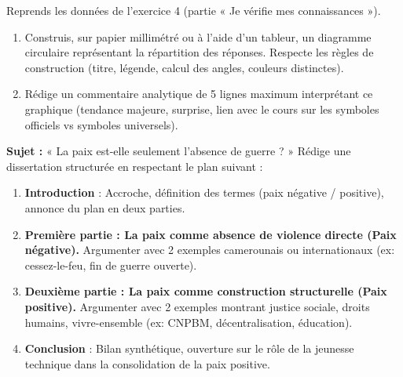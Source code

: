 \documentclass[11pt]{article}
\newcounter{popsec}
\newcounter{popsub}
\newcommand{\courssub}[1]{%
  \stepcounter{popsub}%
  \par\vspace{9pt}\noindent{\popxbold\fontsize{11.5}{13}\selectfont\color{popink}{\color{poporange}\thepopsec.\thepopsub}\hspace{6pt}#1}\par\nopagebreak\vspace{4pt}
}
\begin{document}
\begin{exercice}
Reprends les données de l'exercice 4 (partie « Je vérifie mes connaissances »).
\begin{enumerate}
\item Construis, sur papier millimétré ou à l'aide d'un tableur, un diagramme circulaire représentant la répartition des réponses. Respecte les règles de construction (titre, légende, calcul des angles, couleurs distinctes).
\item Rédige un commentaire analytique de 5 lignes maximum interprétant ce graphique (tendance majeure, surprise, lien avec le cours sur les symboles officiels vs symboles universels).
\end{enumerate}
\end{exercice}

\courssub{Je me prépare au Bac}

\begin{exercice}
\textbf{Sujet :} « La paix est-elle seulement l'absence de guerre ? »
Rédige une dissertation structurée en respectant le plan suivant :
\begin{enumerate}
\item \textbf{Introduction} : Accroche, définition des termes (paix négative / positive), annonce du plan en deux parties.
\item \textbf{Première partie : La paix comme absence de violence directe (Paix négative).} Argumenter avec 2 exemples camerounais ou internationaux (ex: cessez-le-feu, fin de guerre ouverte).
\item \textbf{Deuxième partie : La paix comme construction structurelle (Paix positive).} Argumenter avec 2 exemples montrant justice sociale, droits humains, vivre-ensemble (ex: CNPBM, décentralisation, éducation).
\item \textbf{Conclusion} : Bilan synthétique, ouverture sur le rôle de la jeunesse technique dans la consolidation de la paix positive.
\end{enumerate}
\end{exercice}
\end{document}
